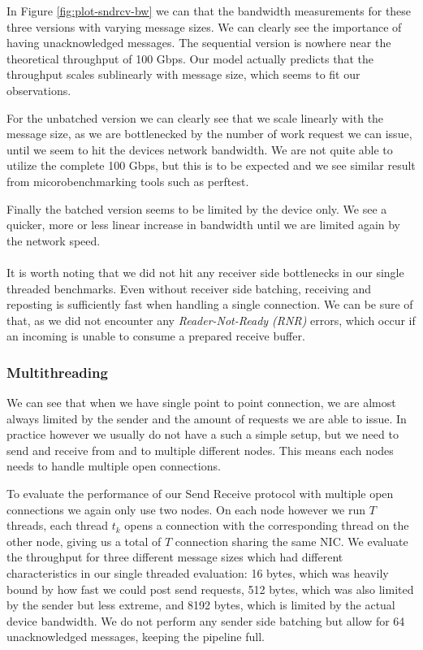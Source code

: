 In Figure \ref{fig:plot-sndrcv-bw} we can that the bandwidth measurements for these three versions with varying message
sizes. We can clearly see the importance of having unacknowledged messages. The sequential version is nowhere near the
theoretical throughput of 100 Gbps. Our model actually predicts that the throughput scales sublinearly with message size,
which seems to fit our observations.

For the unbatched version we can clearly see that we scale linearly with the message size, as we are bottlenecked by 
the number of work request we can issue, until we seem to hit the devices network bandwidth. We are not quite able to
utilize the complete 100 Gbps, but this is to be expected and we see similar result from micorobenchmarking tools such
as perftest.

Finally the batched version seems to be limited by the device only. We see a quicker, more or less linear increase in 
bandwidth until we are limited again by the network speed.


\paragraph{} It is worth noting that we did not hit any receiver side bottlenecks in our single threaded benchmarks.
Even without receiver side batching, receiving and reposting is sufficiently fast when handling a single connection.
We can be sure of that, as we did not encounter any \emph{Reader-Not-Ready (RNR)} errors, which occur if an incoming
is unable to consume a prepared receive buffer.

\subsubsection{Multithreading}

We can see that when we have single point to point connection, we are almost always limited by the sender and the 
amount of requests we are able to issue. In practice however we usually do not have a such a simple setup, but we
need to send and receive from and to multiple different nodes. This means each nodes needs to handle multiple open
connections. 

To evaluate the performance of our Send Receive protocol with multiple open connections we again only use two nodes.  
On each node however we run $T$ threads, each thread $t_k$ opens a connection with the corresponding 
thread on the other node, giving us a total of $T$ connection sharing the same NIC. We evaluate the throughput for 
three different message sizes which had different characteristics in our single threaded evaluation: 16 bytes, 
which was heavily bound by how fast we could post send requests, 512 bytes, which was also limited by the sender
but less extreme, and 8192 bytes, which is limited by the actual device bandwidth. We do not perform any sender side
batching but allow for 64 unacknowledged messages, keeping the pipeline full.

